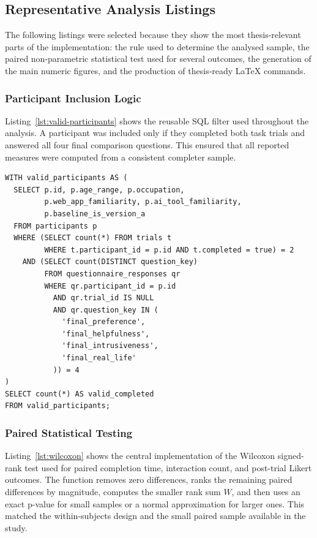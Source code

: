 \begin{appendices}
\subsection{Representative Analysis Listings}

The following listings were selected because they show the most thesis-relevant parts of the implementation: the rule used to determine the analysed sample, the paired non-parametric statistical test used for several outcomes, the generation of the main numeric figures, and the production of thesis-ready LaTeX commands.

\subsubsection{Participant Inclusion Logic}

Listing~\ref{lst:valid-participants} shows the reusable SQL filter used throughout the analysis. A participant was included only if they completed both task trials and answered all four final comparison questions. This ensured that all reported measures were computed from a consistent completer sample.

\begin{listing}[p]
\caption{SQL logic used to define the valid participant sample.}
\label{lst:valid-participants}
\begin{verbatim}
WITH valid_participants AS (
  SELECT p.id, p.age_range, p.occupation,
         p.web_app_familiarity, p.ai_tool_familiarity,
         p.baseline_is_version_a
  FROM participants p
  WHERE (SELECT count(*) FROM trials t
         WHERE t.participant_id = p.id AND t.completed = true) = 2
    AND (SELECT count(DISTINCT question_key)
         FROM questionnaire_responses qr
         WHERE qr.participant_id = p.id
           AND qr.trial_id IS NULL
           AND qr.question_key IN (
             'final_preference',
             'final_helpfulness',
             'final_intrusiveness',
             'final_real_life'
           )) = 4
)
SELECT count(*) AS valid_completed
FROM valid_participants;
\end{verbatim}
\end{listing}

\subsubsection{Paired Statistical Testing}

Listing~\ref{lst:wilcoxon} shows the central implementation of the Wilcoxon signed-rank test used for paired completion time, interaction count, and post-trial Likert outcomes. The function removes zero differences, ranks the remaining paired differences by magnitude, computes the smaller rank sum $W$, and then uses an exact p-value for small samples or a normal approximation for larger ones. This matched the within-subjects design and the small paired sample available in the study.


\end{appendices}
